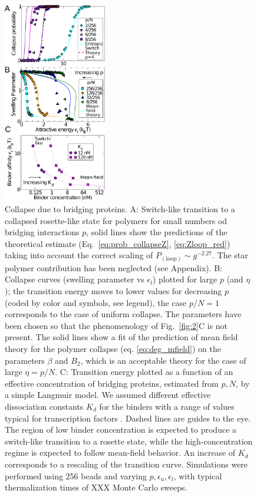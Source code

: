 \documentclass[
preprint,
a4paper,
12pt,
superscriptaddress,
pre]{revtex4}
\begin{document}
\begin{figure}
  \centering
  \includegraphics[width=0.4\textwidth]{fig3}
  \caption{Collapse due to bridging proteins.  A: Switch-like
    transition to a collapsed rosette-like state for polymers for
    small numbers od 
    bridging interactions $p$, solid lines show the predictions of
    the theoretical estimate (Eq.~\ref{eq:prob_collapseZ},
    \ref{eq:Zloop_red})
    taking into
    account the correct scaling of
    $P_\mathrm{(loop)} \sim g^{-2.27}$. The star polymer
    contribution has been neglected (see Appendix).
%
B: Collapse curves (swelling parameter vs
    $\epsilon_l$) plotted for large $p$ (and $\eta$); the transition
    energy moves to 
    lower values for decreasing $p$ (coded by color and
    symbols, see legend), the case $p/N=1$ corresponds to the case of
    uniform collapse. The parameters have been chosen so that the
    phenomenology of Fig.~\ref{fig:2}C is not present. The solid lines
    show a fit of the prediction of mean field theory for the polymer
    collapse (eq. \ref{eq:deg_mfield}) on the parameters $\beta$ and
    $B_2$, which is an acceptable theory for the case of large $\eta= p/N$.
C:  Transition energy plotted as a function of an effective
concentration  of bridging proteins, estimated  from $p,N$, by a
simple 
Langmuir model. We assumed different effective dissociation constants $K_d$ 
for the binders with a range of values typical for transcription
factors \cite{Buchler29042003}. Dashed lines are guides to the
eye. The region of low binder concentration is expected to produce a
switch-like transition to a rosette state, while the
high-concentration regime is expected to follow mean-field behavior. An
increase of $K_d$ corresponds to a rescaling of the transition curve. 
%
Simulations were performed using 256 beads and varying
$p,\epsilon_u,\epsilon_l$, with typical thermalization times of XXX
Monte Carlo sweeps.  }
  \label{fig:3}
\end{figure}
\end{document}

